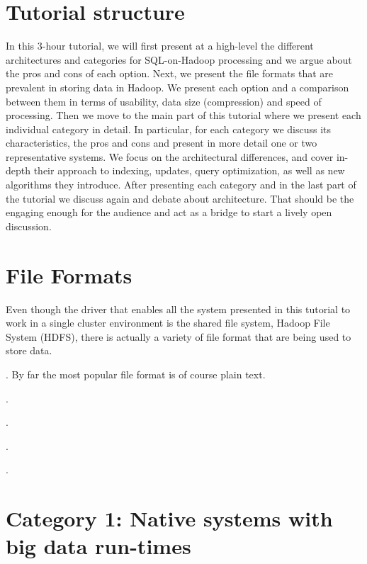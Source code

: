 \documentclass{vldb}
\begin{document}
\section{Tutorial structure}

In this 3-hour tutorial, we will first present at a high-level the different architectures and categories for SQL-on-Hadoop processing and we argue about the pros and cons of each option.
Next, we present the file formats that are prevalent in storing data in Hadoop. We present each option and a comparison between them in terms of usability, data size (compression) and speed of processing. Then we move to the main part of this tutorial where we present each individual category in detail. In particular, for each category we discuss its characteristics, the pros and cons and present in more detail one or two representative systems.
We focus on the architectural differences, and cover in-depth their approach to indexing, updates, query optimization, as well as new algorithms they introduce.
After presenting each category and in the last part of the tutorial we discuss again and debate 
about architecture. That should be the engaging enough for the audience and act as a bridge to start a lively open discussion.  

\section{File Formats}

Even though the driver that enables all the system presented in this tutorial to work in a single cluster environment is the shared file system, Hadoop File System (HDFS), there is actually a variety of file format that are being used to store data. 

. By far the most popular file format is of course plain text.

\vspace{2mm}
.

\vspace{2mm}
.

\vspace{2mm}
.

\vspace{2mm}
.

\section{Category 1: Native systems with big data run-times}
\end{document}
